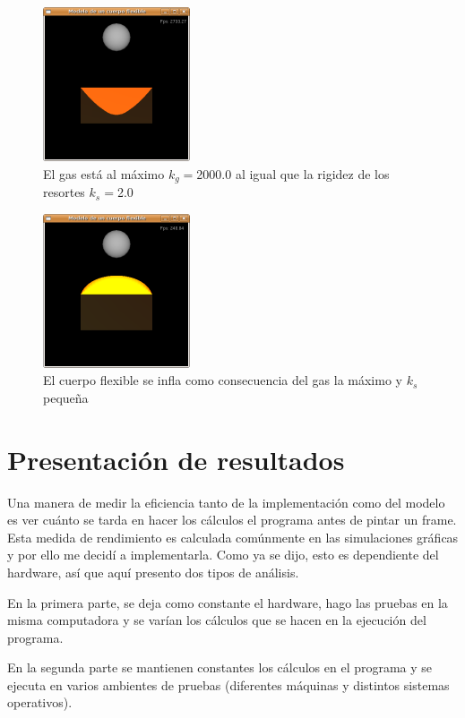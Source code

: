 \begin{figure}
 \centering
 \includegraphics[]{Img/modRes5}
 \caption[Ejecución con fuerza del gas y rigidez al máximo]{El gas está al máximo $k_g=$2000.0 al igual que la rigidez de los resortes $k_s=$2.0}
 \label{res:test5}
\end{figure}

\begin{figure}
 \centering
 \includegraphics[]{Img/modRes6}
 \caption[Ejecución con fuerza del gas y rigidez pequeña]{El cuerpo flexible se infla como consecuencia del gas la máximo y $k_s$ pequeña}
 \label{res:test6}
\end{figure}

\section{Presentación de resultados}

Una manera de medir la eficiencia tanto de la implementación como del modelo es ver cuánto se tarda en hacer los cálculos el programa antes de pintar un frame. Esta medida de rendimiento es calculada comúnmente en las simulaciones gráficas y por ello me decidí a implementarla. Como ya se dijo, esto es dependiente del hardware, así que aquí presento dos tipos de análisis.

En la primera parte, se deja como constante el hardware, hago las pruebas en la misma computadora y se varían los cálculos que se hacen en la ejecución del programa.

En la segunda parte se mantienen constantes los cálculos en el programa y se ejecuta en varios ambientes de pruebas (diferentes máquinas y distintos sistemas operativos).

